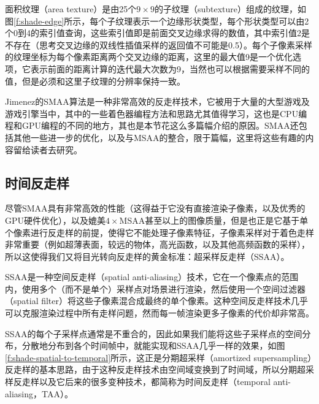 面积纹理（area texture）是由25个$9\times 9$的子纹理（subtexture）组成的纹理，如图\ref{f:shade-edge}所示，每个子纹理表示一个边缘形状类型，每个形状类型可以由2个0到4的索引值查询，这些索引值即是前面交叉边缘求得的数值，其中索引值2是不存在（思考交叉边缘的双线性插值采样的返回值不可能是0.5）。每个子像素采样的纹理坐标为每个像素距离两个交叉边缘的距离，这里的最大值9是一个优化选项，它表示前面的距离计算的迭代最大次数为9，当然也可以根据需要采样不同的值，但是必须和这里子纹理的分辨率保持一致。

Jimenez的SMAA算法是一种非常高效的反走样技术，它被用于大量的大型游戏及游戏引擎当中，其中的一些着色器编程方法和思路尤其值得学习，这也是CPU编程和GPU编程的不同的地方，其也是本节花这么多篇幅介绍的原因。SMAA\cite{a:SMAA:EnhancedSubpixelMorphologicalAntialiasing}还包括其他一些进一步的优化，以及与MSAA的整合，限于篇幅，这里将这些有趣的内容留给读者去研究。






\subsection{时间反走样}\label{sec:shade-temporal-anti-aliasing}
尽管SMAA具有非常高效的性能（这得益于它没有直接渲染子像素，以及优秀的GPU硬件优化），以及媲美$4\times$MSAA甚至以上的图像质量，但是也正是它基于单个像素进行反走样的前提，使得它不能处理子像素特征，子像素采样对于着色走样非常重要（例如超薄表面，较远的物体，高光函数，以及其他高频函数的采样），所以这使得我们又将目光转向反走样的黄金标准：超采样反走样（SSAA）。

SSAA是一种空间反走样（spatial anti-aliasing）技术，它在一个像素点的范围内，使用多个（而不是单个）采样点对场景进行渲染，然后使用一个空间过滤器（spatial filter）将这些子像素混合成最终的单个像素。这种空间反走样技术几乎可以克服渲染过程中所有走样问题，然而每一帧渲染更多子像素的代价却非常高。

SSAA的每个子采样点通常是不重合的，因此如果我们能将这些子采样点的空间分布，分散地分布到各个时间帧中，就能实现和SSAA几乎一样的效果，如图\ref{f:shade-spatial-to-temporal}所示，这正是分期超采样\cite{a:AmortizedSupersampling}（amortized supersampling）反走样的基本思路，由于这种反走样技术由空间域变换到了时间域，所以分期超采样反走样以及它后来的很多变种技术，都简称为时间反走样（temporal anti-aliasing，TAA）。

